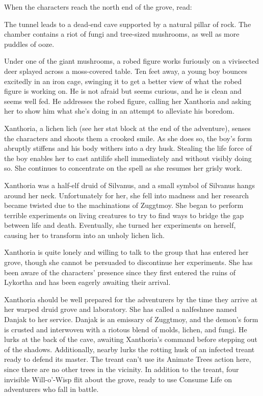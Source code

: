 \documentclass[10pt,a4paper,twoside,bg=print,twocolumn,openany,nodeprecatedcode]{dndbook}
\begin{document}
When the characters reach the north end of the grove, read:

\begin{DndReadAloud}{}
The tunnel leads to a dead-end cave supported by a natural pillar of rock. The chamber contains a riot of fungi and tree-sized mushrooms, as well as more puddles of ooze.

Under one of the giant mushrooms, a robed figure works furiously on a vivisected deer splayed across a moss-covered table. Ten feet away, a young boy bounces excitedly in an iron cage, swinging it to get a better view of what the robed figure is working on. He is not afraid but seems curious, and he is clean and seems well fed. He addresses the robed figure, calling her Xanthoria and asking her to show him what she's doing in an attempt to alleviate his boredom.

\end{DndReadAloud}

Xanthoria, a lichen lich (see her stat block at the end of the adventure), senses the characters and shoots them a crooked smile. As she does so, the boy's form abruptly stiffens and his body withers into a dry husk. Stealing the life force of the boy enables her to cast antilife shell immediately and without visibly doing so. She continues to concentrate on the spell as she resumes her grisly work.

Xanthoria was a half-elf druid of Silvanus, and a small symbol of Silvanus hangs around her neck. Unfortunately for her, she fell into madness and her research became twisted due to the machinations of Zuggtmoy. She began to perform terrible experiments on living creatures to try to find ways to bridge the gap between life and death. Eventually, she turned her experiments on herself, causing her to transform into an unholy lichen lich.

Xanthoria is quite lonely and willing to talk to the group that has entered her grove, though she cannot be persuaded to discontinue her experiments. She has been aware of the characters' presence since they first entered the ruins of Lykortha and has been eagerly awaiting their arrival.

Xanthoria should be well prepared for the adventurers by the time they arrive at her warped druid grove and laboratory. She has called a nalfeshnee named Danjak to her service. Danjak is an emissary of Zuggtmoy, and the demon's form is crusted and interwoven with a riotous blend of molds, lichen, and fungi. He lurks at the back of the cave, awaiting Xanthoria's command before stepping out of the shadows. Additionally, nearby lurks the rotting husk of an infected treant ready to defend its master. The treant can't use its Animate Trees action here, since there are no other trees in the vicinity. In addition to the treant, four invisible Will-o'-Wisp flit about the grove, ready to use Consume Life on adventurers who fall in battle.
\end{document}
